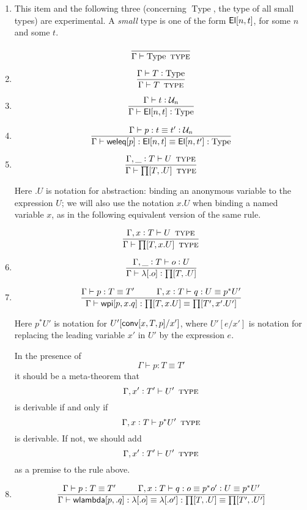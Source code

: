 \documentclass[11pt]{article}
\newcommand{\eqd}{\equiv}
\newcommand{\Eu}{{\cal U}}
\newcommand\spc{{\hskip 26pt}}
\newcommand{\ccolon}{\vcentcolon}
\newcommand{\ccheck}{\vcentcolon}            %
\newcommand{\TYPE}{\mathop{\text{ \sc type}}}
\newcommand{\Type}{\mathop{\text{Type}}}
\newcommand{\ha}[2]{#1[#2]}
\newcommand{\El}{{\sf El}}
\newcommand{\annot}{{\sf annot}}
\newcommand{\haa}[2]{\ha\annot{#1,#2}}
\renewcommand{\haa}[2]{#1}
\newcommand{\conv}{{\sf conv}}
\newcommand{\weleq}{{\sf weleq}}
\newcommand{\wlambda}{{\sf wlambda}}
\newcommand{\wpieq}{{\sf wpi}}
\newcommand{\var}{\char`_}
\begin{document}
\begin{enumerate}
\item
This item and the following three (concerning $\Type$, the type of all small
types) are experimental.  A {\em small} type is one of the form $\ha\El{n,t}$,
for some $n$ and some $t$.

\[\frac{}
       {\Gamma \vdash \Type \TYPE }\]


\item
\[\frac{\Gamma \vdash T \ccolon \Type}
       {\Gamma \vdash T \TYPE}\]

\item
\[\frac{\Gamma \vdash t \ccolon \Eu_n}
       {\Gamma \vdash \ha\El{n,t} \ccheck \Type}\]

\item
\[\frac{\Gamma \vdash p : t \eqd t' \ccheck \Eu_n}
       {\Gamma \vdash \ha\weleq{p} : \ha\El{n,t} \eqd \ha\El{n,t'} : \Type }\]


\item 
\[\frac{ \Gamma, \var \ccolon T \vdash U\TYPE  }{\Gamma \vdash \ha\prod{T,.U}\TYPE}\]

Here $.U$ is notation for abstraction: binding an anonymous variable to the
expression $U$; we will also use the notation $x.U$ when binding a named
variable $x$, as in the following equivalent version of the same rule.

\[\frac{ \Gamma, x \ccolon T \vdash U\TYPE  }
       {\Gamma \vdash \ha\prod{T,x.U}\TYPE}\]

\item 
\[\frac{
  \Gamma, \var \ccolon T \vdash o \ccheck{U}
}{\Gamma \vdash \ha\lambda{.o} \ccheck{\ha\prod{T,.U}}}
\]

\item 
\[ \frac{ 
  \Gamma \vdash p:T \eqd T'  \spc
  \Gamma,  x \ccolon T \vdash q:U \eqd p^*U' 
  } {
  \Gamma \vdash \ha\wpieq{p,x.q}:\ha\prod{T,x.U}\eqd \ha\prod{T',x'.U'}
}\]

Here ${p}^*U'$ is notation for $U'[\haa {\ha\conv{x,T,p}} {T'}/x']$, where
$U'[e/x']$ is notation for replacing the leading variable $x'$ in $U'$ by the
expression $e$.

In the presence of $$\Gamma \vdash p:T \eqd T'  $$ it should be a
meta-theorem that $$\Gamma, x' \ccolon T' \vdash U' \TYPE $$ is
derivable if and only if $$\Gamma, x \ccolon T \vdash p^* U' \TYPE
$$ is derivable.  If not, we should add
$$  \Gamma, x' \ccolon T' \vdash U'  \TYPE  $$
as a premise to the rule above.

\item 
\[ \frac{ 
  \Gamma \vdash p:T \eqd T'  \spc
  \Gamma,  x \ccolon T \vdash q:o \eqd p^* o' \ccolon U \eqd p^*U'
  } {
  \Gamma \vdash \ha\wlambda{p,.q} : \ha\lambda{.o}\eqd \ha\lambda{.o'} : \ha\prod{T,.U} \eqd \ha\prod{T',.U'}
}\]


\end{enumerate}
\end{document}
